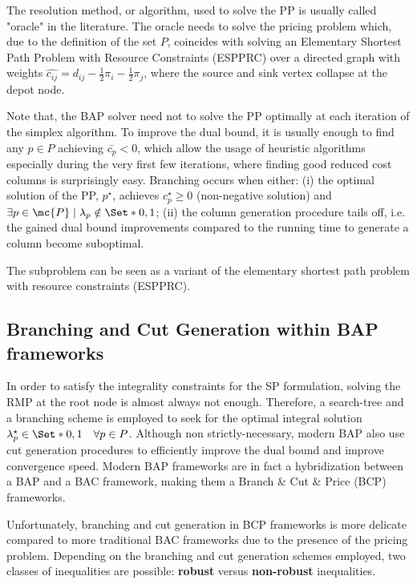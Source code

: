 The resolution method, or algorithm, used to solve the PP is usually called "oracle" in the literature.
The oracle needs to solve the pricing problem which, due to the definition of the set $P$, coincides with solving an Elementary Shortest Path Problem with Resource Constraints (ESPPRC) over a directed graph with weights $\hat{c_{ij}} = d_{ij} - \frac{1}{2} \pi_i - \frac{1}{2} \pi_j$, where the source and sink vertex collapse at the depot node.

Note that, the BAP solver need not to solve the PP optimally at each iteration of the simplex algorithm.
To improve the dual bound, it is usually enough to find any $p \in P$ achieving $\bar{c_p} < 0$, which allow the usage of heuristic algorithms especially during the very first few iterations, where finding good reduced cost columns is surprisingly easy.
Branching occurs when either: (i) the optimal solution of the PP, $p^\star$, achieves $c^\star_p \ge 0$ (non-negative solution) and $\exists p \in \mc{P} \mid \lambda_p \notin \Set*{0, 1}$; (ii) the column generation procedure tails off, i.e. the gained dual bound improvements compared to the running time to generate a column become suboptimal.

The subproblem can be seen as a variant of the elementary shortest path problem with resource constraints (ESPPRC).

\subsection{Branching and Cut Generation within BAP frameworks}
\label{sec:intro-branching-and-cut-generation-within-bap-frameworks}

In order to satisfy the integrality constraints for the SP formulation, solving the RMP at the root node
is almost always not enough.
Therefore, a search-tree and a branching scheme is employed to seek for the optimal integral solution $\lambda^\star_p \in \Set*{0, 1} \quad \forall p \in P$.
Although non strictly-necessary, modern BAP also use cut generation procedures to efficiently improve the dual bound and improve convergence speed.
Modern BAP frameworks are in fact a hybridization between a BAP and a BAC framework, making them a Branch \& Cut \& Price (BCP) frameworks.

\medskip

Unfortunately, branching and cut generation in BCP frameworks is more delicate compared to more traditional BAC frameworks due to the presence of the pricing problem.
Depending on the branching and cut generation schemes employed, two classes of inequalities are possible: \textbf{robust} versus \textbf{non-robust} inequalities.

